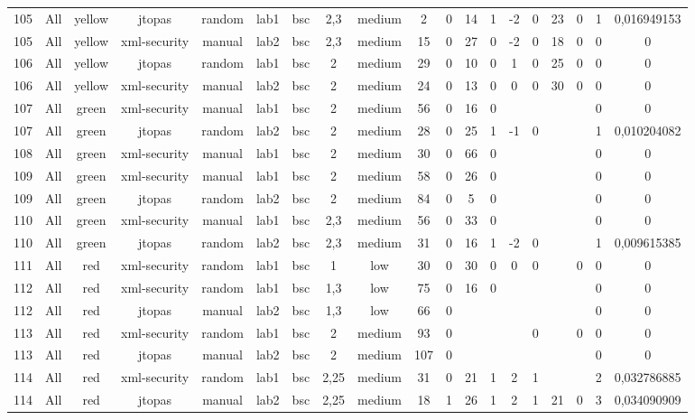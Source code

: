 \begin{table}[ht]
\begin{tabular}{c c c c c c c c c c c c c c c c c c c}
\\105 & All & yellow & jtopas & random & lab1 & bsc & 2,3 & medium & 2 & 0 & 14 & 1 & -2 & 0 & 23 & 0 & 1 & 0,016949153
\\105 & All & yellow & xml-security & manual & lab2 & bsc & 2,3 & medium & 15 & 0 & 27 & 0 & -2 & 0 & 18 & 0 & 0 & 0
\\106 & All & yellow & jtopas & random & lab1 & bsc & 2 & medium & 29 & 0 & 10 & 0 & 1 & 0 & 25 & 0 & 0 & 0
\\106 & All & yellow & xml-security & manual & lab2 & bsc & 2 & medium & 24 & 0 & 13 & 0 & 0 & 0 & 30 & 0 & 0 & 0
\\107 & All & green & xml-security & manual & lab1 & bsc & 2 & medium & 56 & 0 & 16 & 0 &  &  &  &  & 0 & 0
\\107 & All & green & jtopas & random & lab2 & bsc & 2 & medium & 28 & 0 & 25 & 1 & -1 & 0 &  &  & 1 & 0,010204082
\\108 & All & green & xml-security & manual & lab1 & bsc & 2 & medium & 30 & 0 & 66 & 0 &  &  &  &  & 0 & 0
\\109 & All & green & xml-security & manual & lab1 & bsc & 2 & medium & 58 & 0 & 26 & 0 &  &  &  &  & 0 & 0
\\109 & All & green & jtopas & random & lab2 & bsc & 2 & medium & 84 & 0 & 5 & 0 &  &  &  &  & 0 & 0
\\110 & All & green & xml-security & manual & lab1 & bsc & 2,3 & medium & 56 & 0 & 33 & 0 &  &  &  &  & 0 & 0
\\110 & All & green & jtopas & random & lab2 & bsc & 2,3 & medium & 31 & 0 & 16 & 1 & -2 & 0 &  &  & 1 & 0,009615385
\\111 & All & red & xml-security & random & lab1 & bsc & 1 & low & 30 & 0 & 30 & 0 & 0 & 0 &  & 0 & 0 & 0
\\112 & All & red & xml-security & random & lab1 & bsc & 1,3 & low & 75 & 0 & 16 & 0 &  &  &  &  & 0 & 0
\\112 & All & red & jtopas & manual & lab2 & bsc & 1,3 & low & 66 & 0 &  &  &  &  &  &  & 0 & 0
\\113 & All & red & xml-security & random & lab1 & bsc & 2 & medium & 93 & 0 &  &  &  & 0 &  & 0 & 0 & 0
\\113 & All & red & jtopas & manual & lab2 & bsc & 2 & medium & 107 & 0 &  &  &  &  &  &  & 0 & 0
\\114 & All & red & xml-security & random & lab1 & bsc & 2,25 & medium & 31 & 0 & 21 & 1 & 2 & 1 &  &  & 2 & 0,032786885
\\114 & All & red & jtopas & manual & lab2 & bsc & 2,25 & medium & 18 & 1 & 26 & 1 & 2 & 1 & 21 & 0 & 3 & 0,034090909

\end{tabular}
\end{table}
